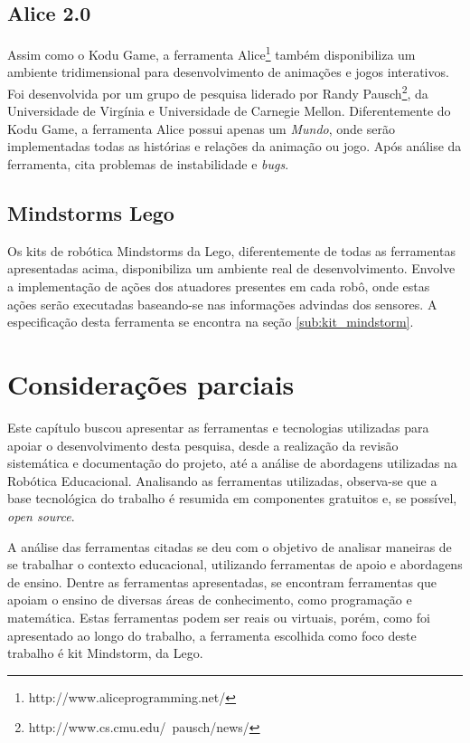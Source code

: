 
	\subsection{Alice 2.0} %
	\label{sub:alice}
		Assim como o Kodu Game, a ferramenta Alice\footnote{http://www.aliceprogramming.net/} também disponibiliza um ambiente tridimensional para desenvolvimento de animações e jogos interativos. Foi desenvolvida por um grupo de pesquisa liderado por Randy Pausch\footnote{http://www.cs.cmu.edu/~pausch/news/}, da Universidade de Virgínia e Universidade de Carnegie Mellon. Diferentemente do Kodu Game, a ferramenta Alice possui apenas um \textit{Mundo}, onde serão implementadas todas as histórias e relações da animação ou jogo. Após análise da ferramenta, \cite{analiseFerramentaEnsinoComputacao} cita problemas de instabilidade e \textit{bugs}.
	

	\subsection{Mindstorms Lego} %
	\label{sub:mindstorm_lego}

		Os kits de robótica Mindstorms da Lego, diferentemente de todas as ferramentas apresentadas acima, disponibiliza um ambiente real de desenvolvimento. Envolve a implementação de ações dos atuadores presentes em cada robô, onde estas ações serão executadas baseando-se nas informações advindas dos sensores. A especificação desta ferramenta se encontra na seção \ref{sub:kit_mindstorm}.
	
	
\section{Considerações parciais} %
\label{sec:considerações_parciais}

	Este capítulo buscou apresentar as ferramentas e tecnologias utilizadas para apoiar o desenvolvimento desta pesquisa, desde a realização da revisão sistemática e documentação do projeto, até a análise de abordagens utilizadas na Robótica Educacional. Analisando as ferramentas utilizadas, observa-se que a base tecnológica do trabalho é resumida em componentes gratuitos e, se possível, \textit{open source}.

	A análise das ferramentas citadas se deu com o objetivo de analisar maneiras de se trabalhar o contexto educacional, utilizando ferramentas de apoio e abordagens de ensino. Dentre as ferramentas apresentadas, se encontram ferramentas que apoiam o ensino de diversas áreas de conhecimento, como programação e matemática. Estas ferramentas podem ser reais ou virtuais, porém, como foi apresentado ao longo do trabalho, a ferramenta escolhida como foco deste trabalho é kit Mindstorm, da Lego.


